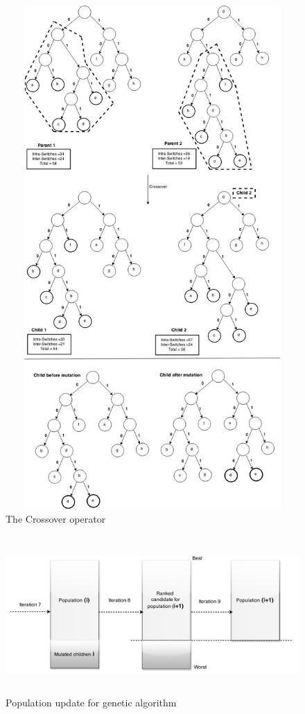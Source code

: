 \documentclass[preprint,12pt]{elsarticle}
\begin{document}
\begin{figure}[tbph]
\begin{center}
\includegraphics[width=400pt,height=545pt]{Images/Drawing1-1.jpg}
\caption{The Crossover operator}
\end{center}
\label{Fig1}
\end{figure}
\begin{figure}[tbph]
\begin{center}
\includegraphics[width=350pt,height=170pt]{Images/Drawing3.jpg}
\caption{Population update for genetic algorithm}
\end{center}
\label{Fig2}
\end{figure}
\end{document}
